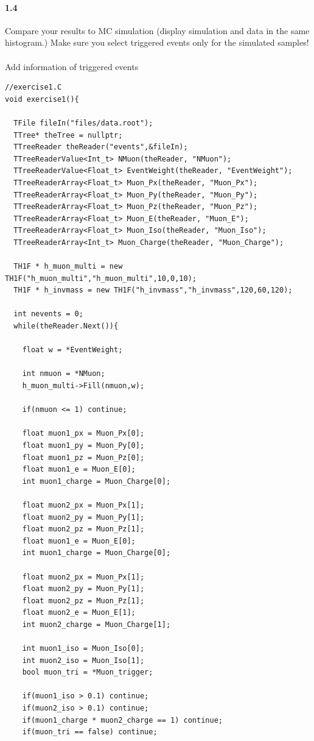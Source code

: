 \documentclass[11pt]{article}
\begin{document}
\paragraph{1.4}
Compare your results to MC simulation (display simulation and data in the same histogram.) Make sure you select triggered events only for the simulated samples!
\\\\
Add information of triggered events
\begin{lstlisting}[emph={if,while,continue,new},emphstyle=\color{nut}]
//exercise1.C
void exercise1(){

  TFile fileIn("files/data.root");
  TTree* theTree = nullptr;
  TTreeReader theReader("events",&fileIn);
  TTreeReaderValue<Int_t> NMuon(theReader, "NMuon");
  TTreeReaderValue<Float_t> EventWeight(theReader, "EventWeight");
  TTreeReaderArray<Float_t> Muon_Px(theReader, "Muon_Px");
  TTreeReaderArray<Float_t> Muon_Py(theReader, "Muon_Py");
  TTreeReaderArray<Float_t> Muon_Pz(theReader, "Muon_Pz");
  TTreeReaderArray<Float_t> Muon_E(theReader, "Muon_E");
  TTreeReaderArray<Float_t> Muon_Iso(theReader, "Muon_Iso");
  TTreeReaderArray<Int_t> Muon_Charge(theReader, "Muon_Charge");

  TH1F * h_muon_multi = new TH1F("h_muon_multi","h_muon_multi",10,0,10);
  TH1F * h_invmass = new TH1F("h_invmass","h_invmass",120,60,120);

  int nevents = 0;
  while(theReader.Next()){
  
    float w = *EventWeight;
  
    int nmuon = *NMuon;
    h_muon_multi->Fill(nmuon,w);

    if(nmuon <= 1) continue;

    float muon1_px = Muon_Px[0];
    float muon1_py = Muon_Py[0];
    float muon1_pz = Muon_Pz[0];
    float muon1_e = Muon_E[0];
    int muon1_charge = Muon_Charge[0];

    float muon2_px = Muon_Px[1];
    float muon2_py = Muon_Py[1];
    float muon2_pz = Muon_Pz[1];
    float muon1_e = Muon_E[0];
    int muon1_charge = Muon_Charge[0];

    float muon2_px = Muon_Px[1];
    float muon2_py = Muon_Py[1];
    float muon2_pz = Muon_Pz[1];
    float muon2_e = Muon_E[1];
    int muon2_charge = Muon_Charge[1];

    int muon1_iso = Muon_Iso[0];
    int muon2_iso = Muon_Iso[1];
    bool muon_tri = *Muon_trigger;

    if(muon1_iso > 0.1) continue;
    if(muon2_iso > 0.1) continue;
    if(muon1_charge * muon2_charge == 1) continue;
    if(muon_tri == false) continue;


\end{lstlisting}
\end{document}
